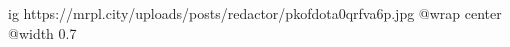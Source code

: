  
 
 
 
 

\ifcmt
  ig https://mrpl.city/uploads/posts/redactor/pkofdota0qrfva6p.jpg
  @wrap center
  @width 0.7
\fi
